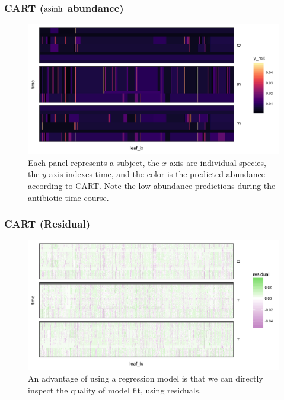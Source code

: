 \documentclass{beamer}
\begin{document}
\begin{frame}
  \frametitle{CART ($\mathop\mathrm{asinh}$ abundance)}
  \begin{figure}[ht]
    \centering
    \includegraphics[width=.8\textwidth]{figure/rpart_complex_2}
    \caption{Each panel represents a subject, the $x$-axis are individual
      species, the $y$-axis indexes time, and the color is the predicted
      abundance according to CART. Note the low abundance predictions during the
      antibiotic time course. \label{fig:rpart_complex} }
  \end{figure}
\end{frame}

\begin{frame}
  \frametitle{CART (Residual)}
  \begin{figure}[ht]
    \centering
    \includegraphics[width=.8\textwidth]{figure/rpart_complex_2_resid}
    \caption{An advantage of using a regression model is that we can directly
      inspect the quality of model fit, using
      residuals. \label{fig:rpart_complex_resid} }
  \end{figure}
\end{frame}
\end{document}

